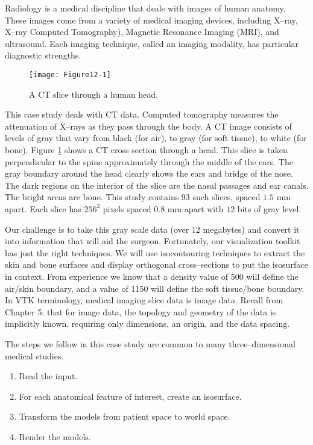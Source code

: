 Radiology is a medical discipline that deals with images of human anatomy.
These images come from a variety of medical imaging devices, including X--ray, X--ray Computed Tomography), Magnetic Resonance Imaging (MRI), and ultrasound. Each imaging technique, called an imaging modality, has particular diagnostic strengths.

\begin{figure}[!htb]
    \centering
    \texttt{[image: Figure12-1]}
    \caption{A CT slice through a human head.}
    \label{fig:Figure12-1}
\end{figure}

This case study deals with CT data. Computed tomography measures the attenuation of X--rays as they pass through the body. A CT image consists of levels of gray that vary from black (for air), to gray (for soft tissue), to white (for bone).  Figure \ref{fig:Figure12-1} shows a CT cross section through a head. This slice is taken perpendicular to the spine approximately through the middle of the ears.  The gray boundary around the head clearly shows the ears and bridge of the nose. The dark regions on the interior of the slice are the nasal passages and ear canals. The bright areas are bone. This study contains 93 such slices, spaced $1.5$ mm apart. Each slice has $256^2$ pixels spaced 0.8 mm apart with $12$ bits of gray level.

Our challenge is to take this gray scale data (over $12$ megabytes) and convert it into information that will aid the surgeon. Fortunately, our visualization toolkit has just the right techniques. We will use isocontouring techniques to extract the skin and bone surfaces and display orthogonal cross--sections to put the isosurface in context. From experience we know that a density value of $500$ will define the air/skin boundary, and a value of 1150 will define the soft tissue/bone boundary. In VTK terminology, medical imaging slice data is image data. Recall from Chapter 5:  that for image data, the topology and geometry of the data is implicitly known, requiring only dimensions, an origin, and the data spacing.

The steps we follow in this case study are common to many three--dimensional medical studies.
\begin{enumerate}

    \item Read the input.

    \item For each anatomical feature of interest, create an isosurface.

    \item Transform the models from patient space to world space.

    \item Render the models.

\end{enumerate}

